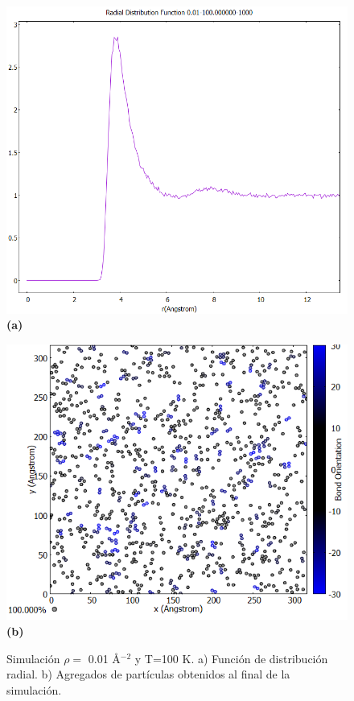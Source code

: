 \begin{figure}[H]
	\centering
	\begin{minipage}[b]{0.47\textwidth}
		\centering
		\includegraphics[width=1\textwidth]{grafico_3x11_0.01_100_rdf.png}
		\textbf{(a)}
	\end{minipage}%
	\hfill
	\begin{minipage}[b]{0.5\textwidth}
		\centering
		\includegraphics[width=1\textwidth]{grafico_3x10_0.01_100_dinamica.png}
		\textbf{(b)}
	\end{minipage}
	
	\caption{\footnotesize Simulación  $\rho=$ 0.01 \AA$^{-2}$ y  T=100 K. a) Función de distribución radial.  b) Agregados de  partículas  obtenidos al final de la simulación.}
	\label{fig:0.01t100}
\end{figure}


